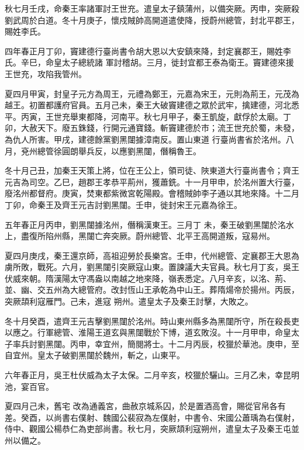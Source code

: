 \begin{pinyinscope}
 秋七月壬戌，命秦王率諸軍討王世充。遣皇太子鎮蒲州，以備突厥。丙申，突厥殺劉武周於白道。冬十月庚子，懷戍賊帥高開道遣使降，授蔚州總管，封北平郡王，賜姓李氏。



 四年春正月丁卯，竇建德行臺尚書令胡大恩以大安鎮來降，封定襄郡王，賜姓李氏。辛巳，命皇太子總統諸
 軍討稽胡。三月，徙封宜都王泰為衛王。竇建德來援王世充，攻陷我管州。



 夏四月甲寅，封皇子元方為周王，元禮為鄭王，元嘉為宋王，元則為荊王，元茂為越王。初置都護府官員。五月己未，秦王大破竇建德之眾於武牢，擒建德，河北悉平。丙寅，王世充舉東都降，河南平。秋七月甲子，秦王凱旋，獻俘於太廟。丁卯，大赦天下。廢五銖錢，行開元通寶錢。斬竇建德於市；流王世充於蜀，未發，為仇人所害。甲戌，建德餘黨劉黑闥據漳南反。置山東道
 行臺尚書省於洺州。八月，兗州總管徐圓朗舉兵反，以應劉黑闥，僭稱魯王。



 冬十月己丑，加秦王天策上將，位在王公上，領司徒、陜東道大行臺尚書令；齊王元吉為司空。乙巳，趙郡王孝恭平荊州，獲蕭銑。十一月甲申，於洺州置大行臺，廢洺州都督府。庚寅，焚東都紫微宮乾陽殿。會稽賊帥李子通以其地來降。十二月丁卯，命秦王及齊王元吉討劉黑闥。壬申，徙封宋王元嘉為徐王。



 五年春正月丙申，劉黑闥據洺州，僭稱漢東王。三月丁
 未，秦王破劉黑闥於洺水上，盡復所陷州縣，黑闥亡奔突厥。蔚州總管、北平王高開道叛，寇易州。



 夏四月庚戌，秦王還京師，高祖迎勞於長樂宮。壬申，代州總管、定襄郡王大恩為虜所敗，戰死。六月，劉黑闥引突厥寇山東。置諫議大夫官員。秋七月丁亥，吳王伏威來朝。隋漢陽太守馮盎以南越之地來降，嶺表悉定。八月辛亥，以洺、荊、並、幽、交五州為大總管府。改封恆山王承乾為中山王。葬隋煬帝於揚州。丙辰，突厥頡利寇雁門。己未，進寇
 朔州。遣皇太子及秦王討擊，大敗之。



 冬十月癸酉，遣齊王元吉擊劉黑闥於洺州。時山東州縣多為黑闥所守，所在殺長吏以應之。行軍總管、淮陽王道玄與黑闥戰於下博，道玄敗沒。十一月甲申，命皇太子率兵討劉黑闥。丙申，幸宜州，簡閱將士。十二月丙辰，校獵於華池。庚申，至自宜州。皇太子破劉黑闥於魏州，斬之，山東平。



 六年春正月，吳王杜伏威為太子太保。二月辛亥，校獵於驪山。三月乙未，幸昆明池，宴百官。



 夏四月己未，舊宅
 改為通義宮，曲赦京城系囚，於是置酒高會，賜從官帛各有差。癸酉，以尚書右僕射、魏國公裴寂為左僕射，中書令、宋國公蕭瑀為右僕射，侍中、觀國公楊恭仁為吏部尚書。秋七月，突厥頡利寇朔州，遣皇太子及秦王屯並州以備之。




\end{pinyinscope}
